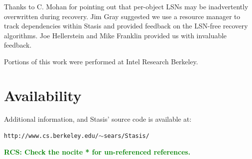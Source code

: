 \documentclass[letterpaper,twocolumn,10pt]{article}
\newcommand{\yad}{Stasis\xspace}
\newcommand{\yads}{Stasis'\xspace}
\newcommand{\rcs}[1]{\textcolor{green}{\bf RCS: #1}}
\begin{document}
Thanks to C. Mohan for pointing out that per-object LSNs may be
inadvertently overwritten during recovery.  Jim Gray suggested we use
a resource manager to track dependencies within \yad and provided
feedback on the LSN-free recovery algorithms.  Joe Hellerstein and
Mike Franklin provided us with invaluable feedback.

Portions of this work were performed at Intel Research Berkeley.

\section{Availability}
\label{sec:avail}

Additional information, and \yads source code is available at:

\begin{center}
{\small{\tt http://www.cs.berkeley.edu/\ensuremath{\sim}sears/\yad/}}
\end{center}

{\footnotesize 

\rcs{Check the nocite * for un-referenced references.}

\nocite{*}
}

\theendnotes
\end{document}
